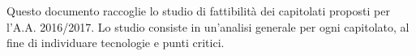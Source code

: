 Questo documento raccoglie lo studio di fattibilità dei capitolati proposti per l'A.A. 2016/2017. Lo studio consiste in un'analisi generale per ogni capitolato, al fine di individuare tecnologie e punti critici.